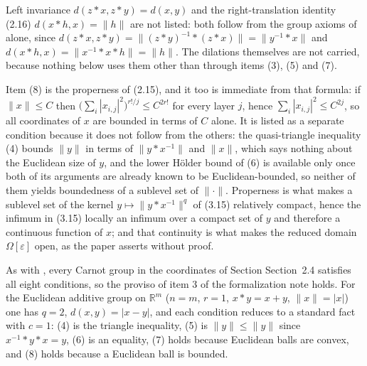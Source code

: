 \begin{definition}
Left invariance $d(z*x,z*y)=d(x,y)$ and the right-translation identity (2.16)
$d(x*h,x)=\|h\|$ are not listed: both follow from the group axioms of
 alone, since $d(z*x,z*y)=\|(z*y)^{-1}*(z*x)\|=\|y^{-1}*x\|$ and
$d(x*h,x)=\|x^{-1}*x*h\|=\|h\|$. The dilations themselves are not carried, because nothing
below uses them other than through items (3), (5) and (7).

Item (8) is the properness of (2.15), and it too is immediate from that formula: if
$\|x\|\le C$ then $\big(\sum_i|x_{i,j}|^2\big)^{r!/j}\le C^{2r!}$ for every layer $j$,
hence $\sum_i|x_{i,j}|^2\le C^{2j}$, so all coordinates of $x$ are bounded in terms of $C$
alone. It is listed as a separate condition because it does not follow from the others: the
quasi-triangle inequality (4) bounds $\|y\|$ in terms of $\|y*x^{-1}\|$ and $\|x\|$, which
says nothing about the Euclidean size of $y$, and the lower H\"older bound of (6) is
available only once both of its arguments are already known to be Euclidean-bounded, so
neither of them yields boundedness of a sublevel set of $\|\cdot\|$. Properness is what makes
a sublevel set of the kernel $y\mapsto\|y*x^{-1}\|^{q}$ of (3.15) relatively compact, hence
the infimum in (3.15) locally an infimum over a compact set of $y$ and therefore a
continuous function of $x$; and that continuity is what makes the reduced domain
$\Omega[\varepsilon]$ open, as the paper asserts without proof.

As with , every Carnot group in the coordinates of Section
Section~2.4 satisfies all eight conditions, so the proviso of item 3 of the
formalization note holds. For the Euclidean additive group on $\mathbb R^m$ ($n=m$, $r=1$,
$x*y=x+y$, $\|x\|=|x|$) one has $q=2$, $d(x,y)=|x-y|$, and each condition reduces to a
standard fact with $c=1$: (4) is the triangle inequality, (5) is $\|y\|\le\|y\|$ since
$x^{-1}*y*x=y$, (6) is an equality, (7) holds because Euclidean balls are convex, and (8) holds because a
Euclidean ball is bounded.
\end{definition}

